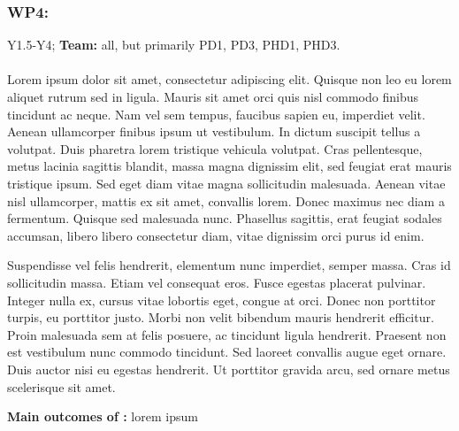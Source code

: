 \subsubsection{WP4: \textbf{\WPD}}

\begin{framed}
 Y1.5-Y4; {\bf Team:} all, but primarily PD1, PD3, PHD1, PHD3.
\end{framed}

\paragraph{\TDA}

\begin{rewrite}
Lorem ipsum dolor sit amet, consectetur adipiscing elit. Quisque non leo eu
lorem aliquet rutrum sed in ligula. Mauris sit amet orci quis nisl commodo
finibus tincidunt ac neque. Nam vel sem tempus, faucibus sapien eu,
imperdiet velit. Aenean ullamcorper finibus ipsum ut vestibulum. In dictum
suscipit tellus a volutpat. Duis pharetra lorem tristique vehicula volutpat.
Cras pellentesque, metus lacinia sagittis blandit, massa magna dignissim
elit, sed feugiat erat mauris tristique ipsum. Sed eget diam vitae magna
sollicitudin malesuada. Aenean vitae nisl ullamcorper, mattis ex sit amet,
convallis lorem. Donec maximus nec diam a fermentum. Quisque sed malesuada
nunc. Phasellus sagittis, erat feugiat sodales accumsan, libero libero
consectetur diam, vitae dignissim orci purus id enim.

Suspendisse vel felis hendrerit, elementum nunc imperdiet, semper massa. Cras id
sollicitudin massa. Etiam vel consequat eros. Fusce egestas placerat
pulvinar. Integer nulla ex, cursus vitae lobortis eget, congue at orci.
Donec non porttitor turpis, eu porttitor justo. Morbi non velit bibendum
mauris hendrerit efficitur. Proin malesuada sem at felis posuere, ac
tincidunt ligula hendrerit. Praesent non est vestibulum nunc commodo
tincidunt. Sed laoreet convallis augue eget ornare. Duis auctor nisi eu
egestas hendrerit. Ut porttitor gravida arcu, sed ornare metus scelerisque
sit amet. 
\end{rewrite}

\begin{framed}
    {\noindent\bf Main outcomes of \tDA:} lorem ipsum 
\end{framed}

\paragraph{\TDB}

